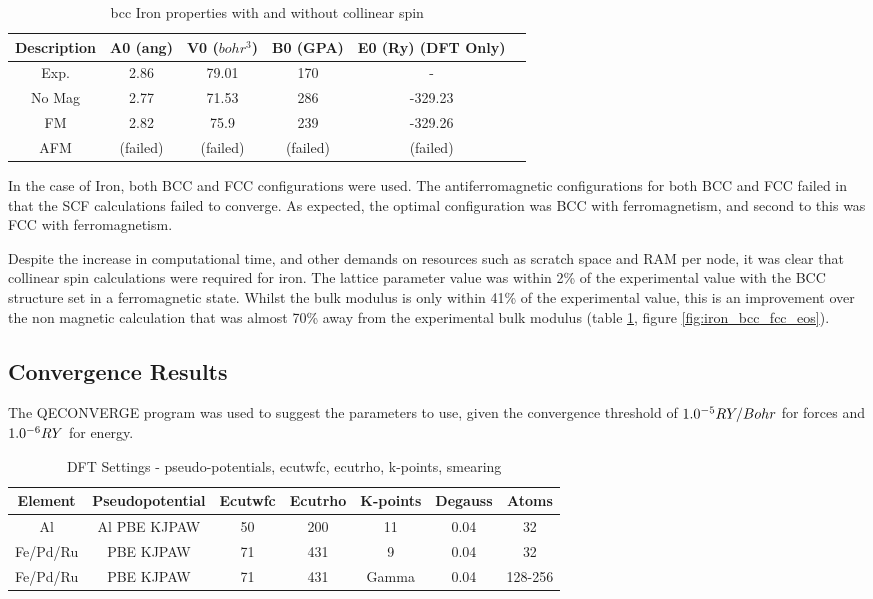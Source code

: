 \begin{table}[h]
\begin{center}
\renewcommand{\arraystretch}{1.2}
\begin{tabular}{c c c c c c}
\hline\hline
Description & A0 (ang) & V0 ($bohr^3$) & B0 (GPA) & E0 (Ry) (DFT Only) \\
\hline\hline
Exp. & 2.86 & 79.01 & 170 & - \\
No Mag & 2.77 & 71.53 & 286 & -329.23 \\
FM & 2.82 & 75.9 & 239 & -329.26 \\
AFM & (failed) & (failed) & (failed) & (failed) \\
\hline\hline
\end{tabular}
\end{center}
\caption{\acrshort{bcc} Iron properties with and without collinear spin}
\label{table:feproperties}
\end{table}

In the case of Iron, both BCC and FCC configurations were used.  The antiferromagnetic configurations for both BCC and FCC failed in that the SCF calculations failed to converge.  As expected, the optimal configuration was BCC with ferromagnetism, and second to this was FCC with ferromagnetism.

Despite the increase in computational time, and other demands on resources such as scratch space and RAM per node, it was clear that collinear spin calculations were required for iron.  The lattice parameter value was within 2\% of the experimental value with the BCC structure set in a ferromagnetic state.  Whilst the bulk modulus is only within 41\% of the experimental value, this is an improvement over the non magnetic calculation that was almost 70\% away from the experimental bulk modulus (table \ref{table:feproperties}, figure \ref{fig:iron_bcc_fcc_eos}).


\FloatBarrier
\subsection{Convergence Results}

The QECONVERGE program was used to suggest the parameters to use, given the convergence threshold of $1.0 \time 10^{-5} RY/Bohr$ for forces and $1.0 \time 10^{-6} RY$ for energy.

\begin{table}[h]
\begin{center}
\renewcommand{\arraystretch}{1.2}
\begin{tabular}{c c c c c c c}
\hline\hline
Element & Pseudopotential & Ecutwfc & Ecutrho & K-points & Degauss & Atoms\\
\hline\hline
Al & Al PBE KJPAW & 50 & 200 & 11 & 0.04 & 32\\
Fe/Pd/Ru & PBE KJPAW & 71 & 431 & 9 & 0.04 & 32 \\ 
Fe/Pd/Ru & PBE KJPAW & 71 & 431 & Gamma & 0.04 & 128-256 \\ 
\hline\hline
\end{tabular}
\end{center}
\caption{DFT Settings - pseudo-potentials, ecutwfc, ecutrho, k-points, smearing}
\label{table:dftsettingsa}
\end{table}
\FloatBarrier

